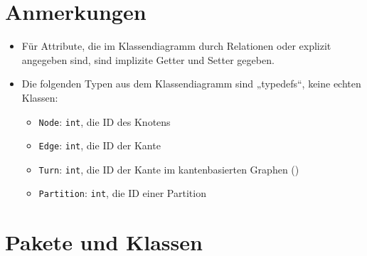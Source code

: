 \documentclass[a4paper, 11pt]{article}
\newcommand{\code}[1]{\texttt{#1}}
\begin{document}


\section{Anmerkungen}

\begin{itemize}
\item Für Attribute, die im Klassendiagramm durch Relationen oder explizit angegeben sind, sind implizite Getter und Setter gegeben.
\item Die folgenden Typen aus dem Klassendiagramm sind „typedefs“, keine echten Klassen:
  \begin{itemize}
  \item \code{Node}: \code{int}, die ID des Knotens
  \item \code{Edge}: \code{int}, die ID der Kante
  \item \code{Turn}: \code{int}, die ID der Kante im kantenbasierten Graphen ()
  \item \code{Partition}: \code{int}, die ID einer Partition
  \end{itemize}
\end{itemize}


\section{Pakete und Klassen}
\end{document}
